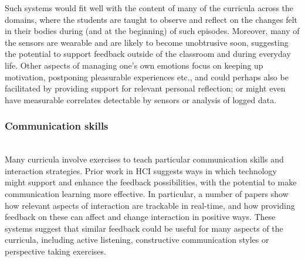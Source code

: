 \documentclass[prodmode,acmtochi]{acmsmall}
\begin{document}
Such systems would fit well with the content of many of the curricula across the domains, where the students are taught to observe and reflect on the changes felt in their bodies during (and at the beginning) of such episodes. Moreover, many of the sensors are wearable and are likely to become unobtrusive soon, suggesting the potential to support feedback outside of the classroom and during everyday life. 
%
 Other aspects of managing one's own emotions focus on keeping up motivation, postponing pleasurable experiences etc., and could perhaps also be facilitated by providing support for relevant personal reflection; or might even have measurable correlates detectable by sensors or analysis of logged data.






        \subsubsection{Communication skills}~\\
        \label{sec:strategies}
        Many curricula involve exercises to teach particular communication skills and interaction strategies. Prior work in HCI suggests ways in which technology might support and enhance the feedback possibilities, with the potential to make communication learning more effective. In particular, a number of papers show how relevant aspects of interaction are trackable in real-time, and how providing feedback on these can affect and change interaction in positive ways. These systems suggest that similar feedback could be useful for many aspects of the curricula, including active listening, constructive communication styles or perspective taking exercises.
        
\end{document}
